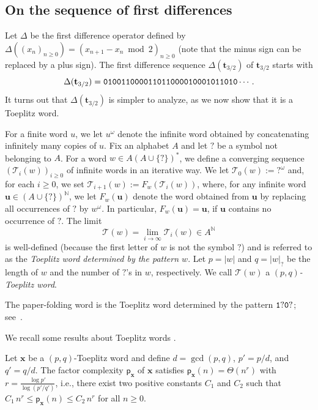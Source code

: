 \documentclass[12pt,reqno]{article}
\newcommand{\que}{\mathord{?}}
\begin{document}
\subsection{On the sequence of first differences}

Let $\Delta$ be the first difference operator defined by $\Delta((x_n)_{n\ge 0}) = (x_{n+1}-x_n \bmod{2})_{n\ge 0}$ (note that the minus sign can be replaced by a plus sign).
The first difference sequence $\Delta(\mathbf{t}_{3/2})$ of $\mathbf{t}_{3/2}$ starts with
\[
  \Delta(\mathbf{t}_{3/2})={\tt 010011000011011000010001011010}\cdots.
\]
It turns out that $\Delta(\mathbf{t}_{3/2})$ is simpler to analyze, as we now show that it is a Toeplitz word.

\begin{definition}
For a finite word $u$, we let $u^\omega$ denote the infinite word obtained by concatenating infinitely many copies of $u$. 
Fix an alphabet $A$ and let $\que$ be a symbol not belonging to $A$. 
For a word $w\in A(A \cup \{\que\})^*$,  we define a converging sequence $(\mathcal{T}_i(w))_{i\ge 0}$ of infinite words in an iterative way.  We let $\mathcal{T}_0(w) := \que^\omega$ and,  for each $i\ge 0$,  we set $\mathcal{T}_{i+1}(w) := F_w(\mathcal{T}_i(w))$,  where,  for any infinite word $\mathbf{u}\in (A \cup \{\que\})^\mathbb{N}$,  we let $F_w(\mathbf{u})$ denote the word obtained from $\mathbf{u}$  by replacing all occurrences of $\que$ by $w^\omega$.
In particular,  $F_w(\mathbf{u}) = \mathbf{u}$, if $\mathbf{u}$ contains no occurrence of $\que$.
The limit
\[
\mathcal{T}(w) = \lim_{i\to \infty} \mathcal{T}_i(w) \in A^\mathbb{N}
\]
is well-defined (because the first letter of $w$ is not the symbol $\que$) and is referred to as the \emph{Toeplitz word determined by the pattern $w$}.
Let $p=|w|$ and $q=|w|_{\que}$ be the length of $w$ and the number of $\que$'s in $w$, respectively. 
We call $\mathcal{T}(w)$ a \emph{$(p,q)$-Toeplitz word}.
\end{definition}

\begin{example}
The paper-folding word is the Toeplitz word determined by the pattern ${\tt 1}\que{\tt 0}\que$; see~\cite{Allouche-Bacher-1992}. 
\end{example}

We recall some results about Toeplitz words \cite{Cassaigne-Karhumaki-1997}.

\begin{theorem}
\label{thm: factor complexities of Toeplitz words}
Let $\mathbf{x}$ be a $(p,q)$-Toeplitz word and define $d=\gcd(p,q)$,  $p'=p/d$,  and $q'=q/d$.
The factor complexity $\mathsf{p}_\mathbf{x}$ of $\mathbf{x}$ satisfies $\mathsf{p}_\mathbf{x}(n) = \Theta(n^r)$ with $r = \frac{\log p'}{\log (p'/q')}$,  i.e.,  there exist two positive constants $C_1$ and $C_2$ such that $C_1\, n^r \le \mathsf{p}_\mathbf{x}(n) \le C_2\, n^r$ for all $n\ge 0$.
\end{theorem}
\end{document}
